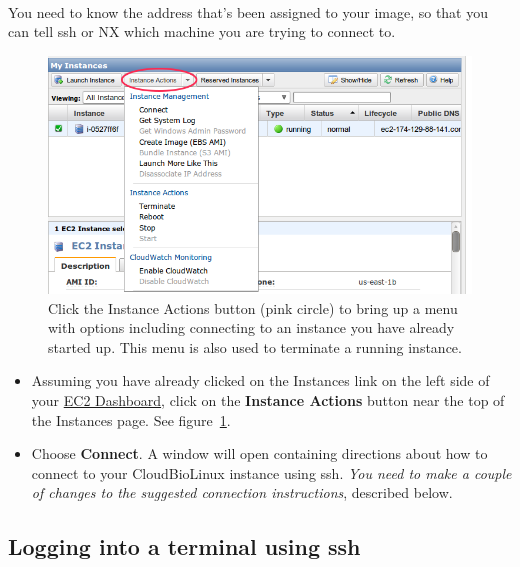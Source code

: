 \paragraph{}You need to know the address that's been assigned to your image, so that you can tell ssh or NX which machine you are trying to connect to.

\begin{figure}[!hd]
	\fbox
	{
		\begin{minipage}{13cm}
\includegraphics[width=\maxwidth]{"images/instancesOptions"}
\caption[Start an Instance]{\label{fig:instancesOptions}Click the Instance Actions button (pink circle) to bring up a menu with options including connecting to an instance you have already started up. This menu is also used to terminate a running instance.}
		\end{minipage}
	}
\end{figure}


\begin{itemize}
\item Assuming you have already clicked on the Instances link on the left side of your \href{https://console.aws.amazon.com/ec2/home}{EC2 Dashboard}, click on the \textbf{Instance Actions} button near the top of the Instances page. See figure~\ref{fig:instancesOptions}.
\item Choose \textbf{Connect}. A window will open containing directions about how to connect to your CloudBioLinux instance using ssh. \emph{You need to make a couple of changes to the suggested connection instructions}, described below.
\end{itemize}


\subsection{Logging into a terminal using ssh}

